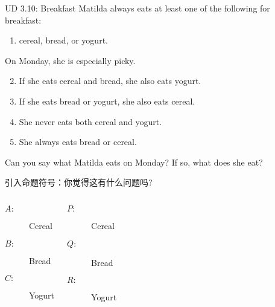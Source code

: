 \begin{frame}{}
  \begin{exampleblock}{UD 3.10: Breakfast}
    Matilda always eats at least one of the following for breakfast: \\
    \begin{enumerate}
      \item cereal, bread, or yogurt. 
    \end{enumerate}
    On Monday, she is especially picky.

    \begin{enumerate}
      \setcounter{enumi}{1}
      \item If she eats cereal and bread, she also eats yogurt.
      \item If she eats bread or yogurt, she also eats cereal.
      \item She never eats both cereal and yogurt.
      \item She always eats bread or cereal.
    \end{enumerate}

    Can you say what Matilda eats on Monday? If so, what does she eat?
  \end{exampleblock}
\end{frame}

\begin{frame}{}
  引入命题符号：你觉得这有什么问题吗?
  \begin{columns}
      \begin{description}
	\item[$A:$] Cereal
	\item[$B:$] Bread
	\item[$C:$] Yogurt
      \end{description}
      \begin{description}
	\item[$P:$] Cereal
	\item[$Q:$] Bread
	\item[$R:$] Yogurt
      \end{description}
  \end{columns}

  \pause
  \vspace{0.30cm}
\end{frame}


